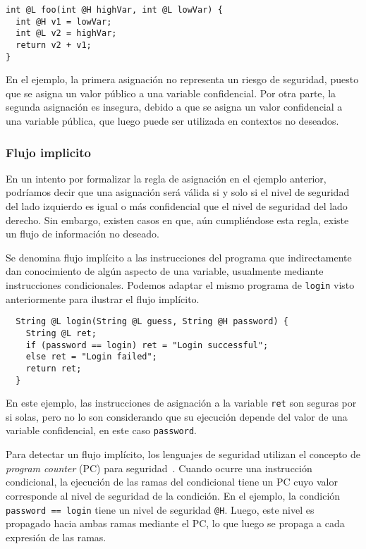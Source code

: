 \begin{lstlisting}
int @L foo(int @H highVar, int @L lowVar) {
  int @H v1 = lowVar;
  int @L v2 = highVar;
  return v2 + v1;
}
\end{lstlisting}

En el ejemplo, la primera asignación no representa un riesgo de seguridad, puesto que se asigna un valor público a una variable confidencial. Por otra parte, la segunda asignación es insegura, debido a que se asigna un valor confidencial a una variable pública, que luego puede ser utilizada en contextos no deseados.
\subsubsection{Flujo implicito}
En un intento por formalizar la regla de asignación en el ejemplo anterior, podríamos decir que una asignación será válida si y solo si el nivel de seguridad del lado izquierdo es igual o más confidencial que el nivel de seguridad del lado derecho. Sin embargo, existen casos en que, aún cumpliéndose esta regla, existe un flujo de información no deseado.

Se denomina flujo implícito a las instrucciones del programa que indirectamente dan conocimiento de algún aspecto de una variable, usualmente mediante instrucciones condicionales. Podemos adaptar el mismo programa de \texttt{login} visto anteriormente para ilustrar el flujo implícito.

\begin{lstlisting}
  String @L login(String @L guess, String @H password) {
    String @L ret;
    if (password == login) ret = "Login successful";
    else ret = "Login failed";
    return ret;
  }
\end{lstlisting}

En este ejemplo, las instrucciones de asignación a la variable \texttt{ret} son seguras por si solas, pero no lo son considerando que su ejecución depende del valor de una variable confidencial, en este caso \texttt{password}.

Para detectar un flujo implícito, los lenguajes de seguridad utilizan el concepto de \textit{program counter} (PC) para seguridad~\cite{pc}. Cuando ocurre una instrucción condicional, la ejecución de las ramas del condicional tiene un PC cuyo valor corresponde al nivel de seguridad de la condición. En el ejemplo, la condición \texttt{password == login} tiene un nivel de seguridad \texttt{@H}. Luego, este nivel es propagado hacia ambas ramas mediante el PC, lo que luego se propaga a cada expresión de las ramas.

